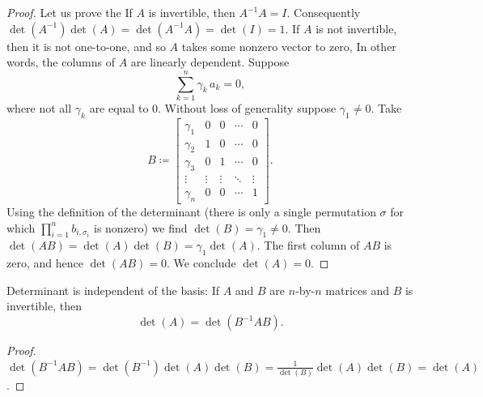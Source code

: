 \begin{proof}
Let us prove the
If $A$ is invertible,
then $A^{-1}A = I$.
Consequently $\det(A^{-1})\det(A) = \det(A^{-1}A) = \det(I) = 1$.
If $A$ is not invertible, then it is not one-to-one, and so $A$ takes
some nonzero vector to zero,  In other words, the columns of $A$ are linearly dependent.
Suppose 
\begin{equation*}
\sum_{k=1}^n \gamma_k\, a_k = 0 ,
\end{equation*}
where not all $\gamma_k$ are equal to 0.
Without loss of generality suppose $\gamma_1\neq 0$.
Take
\begin{equation*}
B \coloneqq 
\begin{bmatrix}
\gamma_1 & 0 & 0 & \cdots & 0 \\
\gamma_2 & 1 & 0 & \cdots & 0 \\
\gamma_3 & 0 & 1 & \cdots & 0 \\
\vdots & \vdots & \vdots & \ddots & \vdots \\
\gamma_n & 0 & 0 & \cdots & 1
\end{bmatrix} .
\end{equation*}
Using the definition of the determinant (there is only a single
permutation $\sigma$ for which $\prod_{i=1}^n b_{i,\sigma_i}$ is nonzero)
we find $\det(B) = \gamma_1 \not= 0$.
Then
$\det(AB) = \det(A)\det(B) = \gamma_1\det(A)$.
The first column of $AB$ is zero, and hence $\det(AB) = 0$.  We conclude
$\det(A) = 0$.
\end{proof}

\begin{prop}
Determinant is independent of the basis:  If $A$ and $B$ are
$n$-by-$n$ matrices and $B$ is
invertible, then
\begin{equation*}
\det(A) = \det(B^{-1}AB) .
\end{equation*}
\end{prop}

\begin{proof}
$\det(B^{-1}AB) = 
\det(B^{-1})\det(A)\det(B) =
\frac{1}{\det(B)}\det(A)\det(B) = \det(A)$.
\end{proof}

